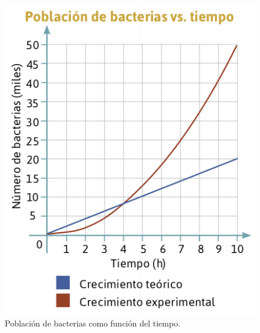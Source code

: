 \begin{minipage}[t][][t]{0.35\textwidth}
    \begin{figure}[H]
        \centering
        \includegraphics[width=0.9\linewidth]{../images/20230326212418}
        \caption{Población de bacterias como función del tiempo.}
        \label{fig:20230326212418}
    \end{figure}
\end{minipage}
